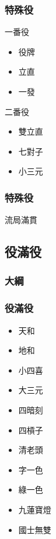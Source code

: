 \documentclass[utf8]{beamer}
\begin{document}
\begin{CJK}{UTF8}{bkai}
\begin{frame}
  \frametitle{特殊役}
  \begin{block}{一番役}
    \begin{itemize}
    \item 役牌
    \item 立直
    \item 一發
    \end{itemize}
  \end{block}
  \begin{block}{二番役}
    \begin{itemize}
    \item 雙立直
    \item 七對子
    \item 小三元
    \end{itemize}
  \end{block}
\end{frame}

\begin{frame}
  \frametitle{特殊役}
  \begin{exampleblock}{流局滿貫}
  \end{exampleblock}
\end{frame}

\subsection{役滿役}
\begin{frame}
  \frametitle{大綱}
  \begin{multicols}{2}
  \end{multicols}
\end{frame}

\begin{frame}
  \frametitle{役滿役}
  \begin{itemize}
    \item 天和
    \item 地和
    \item 小四喜
    \item 大三元
    \item 四暗刻
    \item 四槓子
    \item 清老頭
    \item 字一色
    \item 綠一色
    \item 九蓮寶燈
    \item 國士無雙
  \end{itemize}
\end{frame}


\end{CJK}
\end{document}
